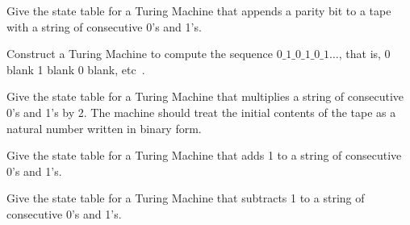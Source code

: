 \begin{questions}
\begin{solution}
\end{solution}


\question
Give the state table for a Turing Machine that appends a parity bit to a tape with a string of consecutive 0's and 1's.

\question
Construct a Turing Machine to compute the sequence $0\_1\_0\_1\_0\_1\ldots$, that is, 0 blank 1 blank 0 blank, etc~\cite{turing}.

\question
Give the state table for a Turing Machine that multiplies a string of consecutive 0's and 1's by 2. The machine should treat the initial contents of the tape as a natural number written in binary form.

\question
Give the state table for a Turing Machine that adds 1 to a string of consecutive 0's and 1's.

\question
Give the state table for a Turing Machine that subtracts 1 to a string of consecutive 0's and 1's.


\end{questions}

